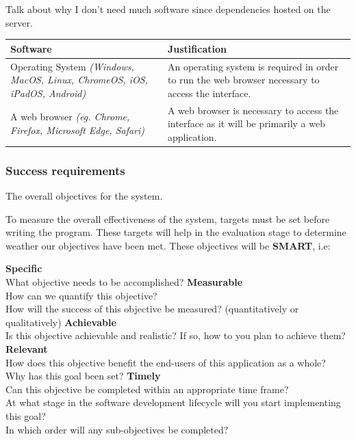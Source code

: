 \documentclass{article}
\begin{document}
Talk about why I don't need much software since dependencies hosted on the server.\\

\begin{tabular}{ |p{}|p{}| }
    \hline
    \textbf{Software}                                                & \textbf{Justification}          \\
    \hline
    Operating System \newline
    \textit{(Windows, MacOS, Linux, ChromeOS, iOS, iPadOS, Android)} &
    An operating system is required in order to run the web browser necessary to access the interface. \\
    \hline
    A web browser \newline
    \textit{(eg. Chrome, Firefox, Microsoft Edge, Safari)}           &
    A web browser is necessary to access the interface as it will be primarily a web application.      \\
    \hline
\end{tabular}

\pagebreak

\subsubsection{Success requirements}

The overall objectives for the system.

\noindent To measure the overall effectiveness of the system, targets must be set before writing the program.
These targets will help in the evaluation stage to determine weather our objectives have been met.
These objectives will be \textbf{SMART}, i.e:

\begin{outline}
    \1 \textbf{Specific}\\
    What objective needs to be accomplished?
    \1 \textbf{Measurable}\\
    How can we quantify this objective?\\
    How will the success of this objective be measured? (quantitatively or qualitatively)
    \1 \textbf{Achievable}\\
    Is this objective achievable and realistic? If so, how to you plan to achieve them?
    \1 \textbf{Relevant}\\
    How does this objective benefit the end-users of this application as a whole?\\
    Why has this goal been set?
    \1 \textbf{Timely}\\
    Can this objective be completed within an appropriate time frame?\\
    At what stage in the software development lifecycle will you start implementing this goal?\\
    In which order will any sub-objectives be completed?
\end{outline}
\end{document}
